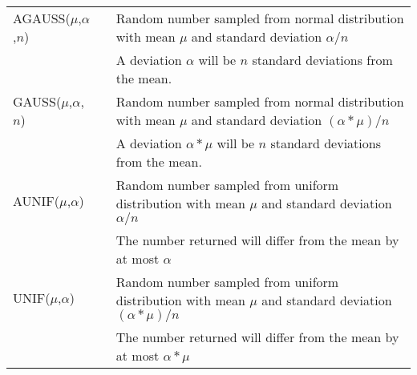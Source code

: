 {\begin{longtable}{>{\raggedright\small}m{1in}>{\raggedright\small}m{2in}>{\raggedright\let\\\tabularnewline\small}m{2in}}
    AGAUSS($\mu$,$\alpha$,$n$) &  & Random number sampled from normal distribution with mean $\mu$ and standard deviation $\alpha/n$ \\ 
    & & A deviation $\alpha$ will be $n$ standard deviations from the mean.\footnotemark[1]  \\\hline 

    GAUSS($\mu$,$\alpha$,$n$) &  & Random number sampled from normal distribution with mean $\mu$ and standard deviation $(\alpha*\mu)/n$ \\ 
    & & A deviation $\alpha*\mu$ will be $n$ standard deviations from the mean.\footnotemark[1]  \\\hline 


    AUNIF($\mu$,$\alpha$) &  & Random number sampled from uniform distribution with mean $\mu$ and standard deviation $\alpha/n$ \\ 
    & & The number returned will differ from the mean by at most $\alpha$ \footnotemark[1]  \\\hline 

    UNIF($\mu$,$\alpha$) &  & Random number sampled from uniform distribution with mean $\mu$ and standard deviation $(\alpha*\mu)/n$ \\ 
    & & The number returned will differ from the mean by at most $\alpha*\mu$ \footnotemark[1]  \\\hline 


\end{longtable}}
